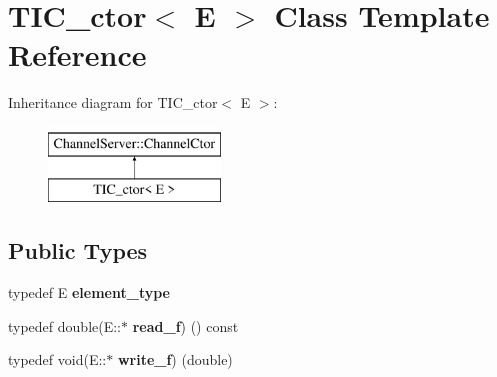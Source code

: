 \hypertarget{classTIC__ctor}{}\section{T\+I\+C\+\_\+ctor$<$ E $>$ Class Template Reference}
\label{classTIC__ctor}
Inheritance diagram for T\+I\+C\+\_\+ctor$<$ E $>$\+:\begin{figure}[H]
\begin{center}
\leavevmode
\includegraphics[height=2.000000cm]{classTIC__ctor}
\end{center}
\end{figure}
\subsection*{Public Types}
\begin{DoxyCompactItemize}
\item 
\mbox{\label{classTIC__ctor_a1048d6ca3def8704e4bc47d61e751741}} 
typedef E {\bfseries element\+\_\+type}
\item 
\mbox{\label{classTIC__ctor_a86d1550b991f1417e696c89fb7aa2559}} 
typedef double(E\+::$\ast$ {\bfseries read\+\_\+f}) () const
\item 
\mbox{\label{classTIC__ctor_a022af70ffebac6cd7a2de904a89f198f}} 
typedef void(E\+::$\ast$ {\bfseries write\+\_\+f}) (double)
\end{DoxyCompactItemize}
